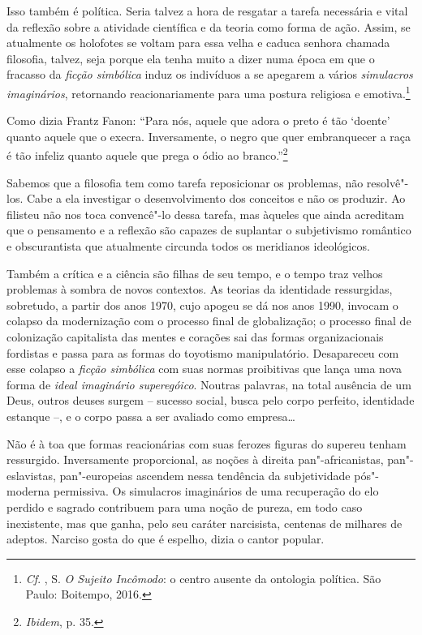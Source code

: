 Isso também é política. Seria talvez a hora de resgatar a tarefa
necessária e vital da reflexão sobre a atividade científica e da teoria
como forma de ação. Assim, se atualmente os holofotes se voltam para
essa velha e caduca senhora chamada filosofia, talvez, seja porque ela
tenha muito a dizer numa época em que o fracasso da \emph{ficção
simbólica} induz os indivíduos a se apegarem a vários \emph{simulacros
imaginários}, retornando reacionariamente para uma postura religiosa e
emotiva.\footnote{\emph{Cf}. , S. \emph{O
  Sujeito Incômodo}: o centro ausente da ontologia política. São Paulo:
  Boitempo, 2016.}

Como dizia Frantz Fanon: ``Para nós, aquele que adora o preto é tão
`doente' quanto aquele que o execra. Inversamente, o negro que quer
embranquecer a raça é tão infeliz quanto aquele que prega o ódio ao
branco.''\footnote{\emph{Ibidem}, p. 35.}

Sabemos que a filosofia tem como tarefa reposicionar os problemas, não
resolvê"-los. Cabe a ela investigar o desenvolvimento dos conceitos e não
os produzir. Ao filisteu não nos toca convencê"-lo dessa tarefa, mas
àqueles que ainda acreditam que o pensamento e a reflexão são capazes de
suplantar o subjetivismo romântico e obscurantista que atualmente
circunda todos os meridianos ideológicos.

Também a crítica e a ciência são filhas de seu tempo, e o tempo traz
velhos problemas à sombra de novos contextos. As teorias da identidade
ressurgidas, sobretudo, a partir dos anos 1970, cujo apogeu se dá nos
anos 1990, invocam o colapso da modernização com o processo final de
globalização; o processo final de colonização capitalista das mentes e
corações sai das formas organizacionais fordistas e passa para as formas
do toyotismo manipulatório. Desapareceu com esse colapso a \emph{ficção
simbólica} com suas normas proibitivas que lança uma nova forma de
\emph{ideal imaginário superegóico}. Noutras palavras, na total ausência
de um Deus, outros deuses surgem -- sucesso social, busca pelo corpo
perfeito, identidade estanque --, e o corpo passa a ser avaliado como
empresa\ldots{}

Não é à toa que formas reacionárias com suas ferozes figuras do supereu
tenham ressurgido. Inversamente proporcional, as noções à direita
pan"-africanistas, pan"-eslavistas, pan"-europeias ascendem nessa tendência
da subjetividade pós"-moderna permissiva. Os simulacros imaginários de
uma recuperação do elo perdido e sagrado contribuem para uma noção de
pureza, em todo caso inexistente, mas que ganha, pelo seu caráter
narcisista, centenas de milhares de adeptos. Narciso gosta do que é
espelho, dizia o cantor popular.

